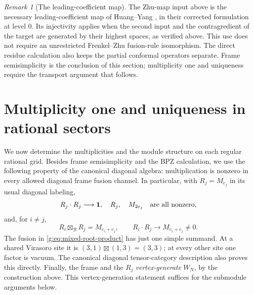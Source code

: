 \documentclass[11pt,a4paper]{article}
\numberwithin{equation}{section}
\theoremstyle{definition}\newtheorem{definition}[theorem]{Definition}
\theoremstyle{remark}\newtheorem{remark}[theorem]{Remark}
\begin{document}
\begin{remark}[The leading-coefficient map]
The Zhu-map input above is the necessary leading-coefficient map of
Huang--Yang \cite[Lemma 5.5 and Propositions 5.6--5.8]{huangyang},
in their corrected formulation at level $0$.  Its injectivity applies
when the second input and the contragredient of the target are
generated by their highest spaces, as verified above.  This use does
not require an unrestricted Frenkel--Zhu fusion-rule isomorphism.
The direct residue calculation also keeps the partial conformal
operators separate.  Frame semisimplicity is the conclusion of this
section; multiplicity one and uniqueness require the transport
argument that follows.
\end{remark}
\section{Multiplicity one and uniqueness in rational sectors}
\label{g:sec:generic-sector-classification}

We now determine the multiplicities and the module structure on each
regular rational grid.  Besides frame semisimplicity and the BPZ
calculation, we use the following property of the canonical diagonal
algebra: multiplication is nonzero in every allowed diagonal frame
fusion channel. In particular, with $R_j=M_{e_j}$ in its usual diagonal
labeling,
\begin{equation}
 R_j\cdot R_j\longrightarrow\mathbf1,\quad R_j,\quad M_{2e_j}
 \quad\hbox{are all nonzero},                         \label{g:eq:root-self-products}
\end{equation}
and, for $i\ne j$,
\begin{equation}
 R_i\boxtimes_{\mathcal B}R_j=M_{e_i+e_j},\qquad
 R_i\cdot R_j\longrightarrow M_{e_i+e_j}\ne0.         \label{g:eq:mixed-root-product}
\end{equation}
The fusion in \eqref{g:eq:mixed-root-product} has just one simple summand. At a shared Virasoro
site it is $(3,1)\boxtimes(1,3)=(3,3)$; at every other site one
factor is vacuum. The canonical diagonal tensor-category description
also proves this directly. Finally, the frame and the $R_j$
\emph{vertex-generate} $W_N$, by the construction above.  This
vertex-generation statement suffices for the submodule arguments
below.
\end{document}
